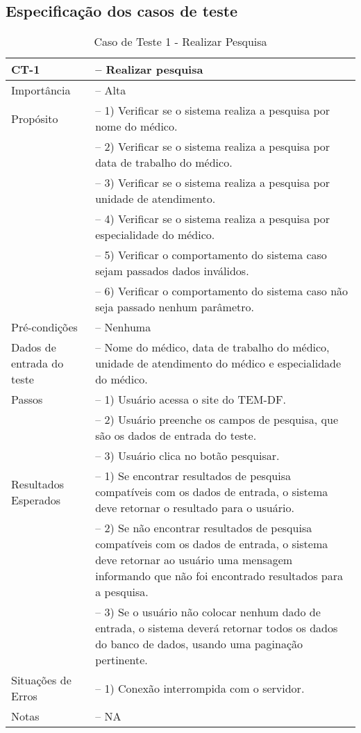 \begin{anexosenv}

\partanexos

\chapter{Especificação dos casos de teste}

\begin{longtable}{p{4cm}>{-- }p{9cm}}
  \caption{Caso de Teste 1 - Realizar Pesquisa}\label{tab:ct1} \\
  \toprule
  \noindent
  CT-1                      & Realizar pesquisa \\ \midrule
  Importância               & Alta\\ \midrule
  Propósito                 & 1) Verificar se o sistema realiza a pesquisa por nome do médico.\\ 
                            & 2) Verificar se o sistema realiza a pesquisa por data de trabalho do médico.\\
                            & 3) Verificar se o sistema realiza a pesquisa por unidade de atendimento.\\
                            & 4) Verificar se o sistema realiza a pesquisa por especialidade do médico.\\
                            & 5) Verificar o comportamento do sistema caso sejam passados dados inválidos.\\
                            & 6) Verificar o comportamento do sistema caso não seja passado nenhum parâmetro.\\ \midrule
  Pré-condições             & Nenhuma\\ \midrule
  Dados de entrada do teste & Nome do médico, data de trabalho do médico, unidade de atendimento do médico e especialidade do médico.\\ \midrule
  Passos                    & 1) Usuário acessa o site do TEM-DF.\\
  & 2) Usuário preenche os campos de pesquisa, que são os dados de entrada do teste.\\
  & 3) Usuário clica no botão pesquisar.\\ \midrule
  Resultados Esperados      & 1) Se encontrar resultados de pesquisa compatíveis com os dados de entrada, o sistema deve retornar o resultado para o usuário.\\
  & 2) Se não encontrar resultados de pesquisa compatíveis com os dados de entrada, o sistema deve retornar ao usuário uma mensagem informando que não foi encontrado resultados para a pesquisa.\\
  & 3) Se o usuário não colocar nenhum dado de entrada, o sistema deverá retornar todos os dados do banco de dados, usando uma paginação pertinente.\\ \midrule
  Situações de Erros        & 1) Conexão interrompida com o servidor.\\ \midrule
  Notas                     & NA                                     \\ \bottomrule
\end{longtable}


\end{anexosenv}
